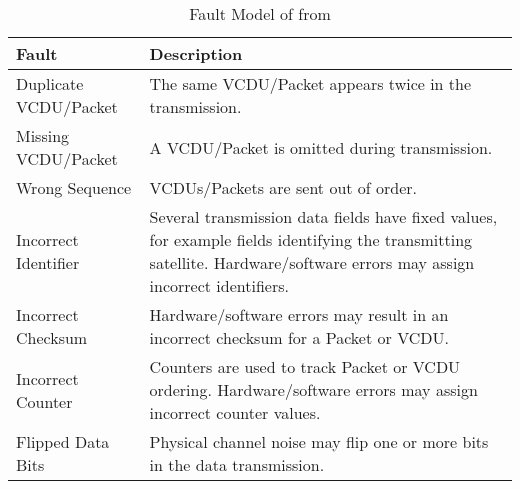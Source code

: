 \begin{table}[h]
\begin{center}
\small
\begin{tabular}{|p{4cm}|p{10cm}|}
\hline
\textbf{Fault}&\textbf{Description}\\
\hline
Duplicate VCDU/Packet&The same VCDU/Packet appears twice in the transmission.\\
Missing VCDU/Packet& A VCDU/Packet is omitted during transmission.\\
Wrong Sequence& VCDUs/Packets are sent out of order. \\
Incorrect Identifier& Several transmission data fields have fixed values, for example fields identifying the transmitting satellite. Hardware/software errors may assign incorrect identifiers.\\
Incorrect Checksum& Hardware/software errors may result in an incorrect checksum for a Packet or VCDU.\\
Incorrect Counter& Counters are used to track Packet or VCDU ordering. Hardware/software errors may assign incorrect counter values.\\
Flipped Data Bits& Physical channel noise may flip one or more bits in the data transmission.\\
\hline
\end{tabular}
\end{center}
\caption{Fault Model of from \cite{di2015generating}}
\label{table:faultModel:SES}
\end{table}%